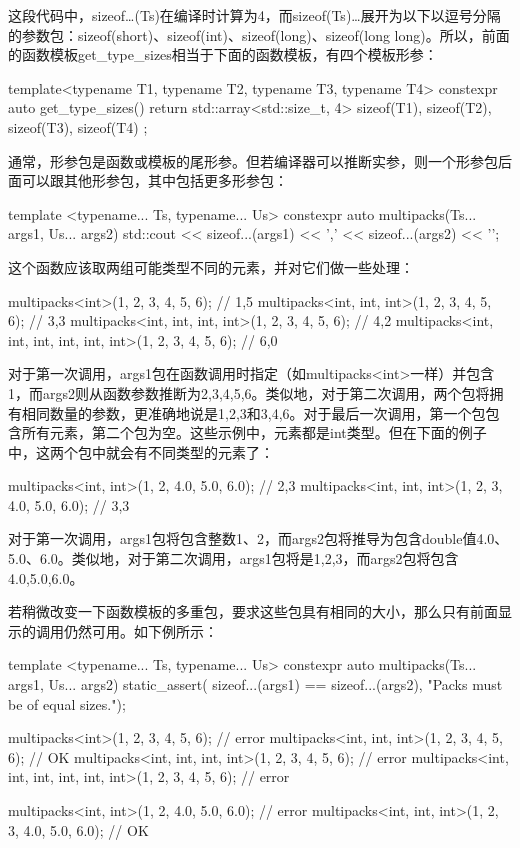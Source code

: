 这段代码中，sizeof…(Ts)在编译时计算为4，而sizeof(Ts)…展开为以下以逗号分隔的参数包：sizeof(short)、sizeof(int)、sizeof(long)、sizeof(long long)。所以，前面的函数模板get\_type\_sizes相当于下面的函数模板，有四个模板形参：

\begin{cpp}
template<typename T1, typename T2,
         typename T3, typename T4>
constexpr auto get_type_sizes()
{
	return std::array<std::size_t, 4> {
		sizeof(T1), sizeof(T2), sizeof(T3), sizeof(T4)
	};
}
\end{cpp}

通常，形参包是函数或模板的尾形参。但若编译器可以推断实参，则一个形参包后面可以跟其他形参包，其中包括更多形参包：

\begin{cpp}
template <typename... Ts, typename... Us>
constexpr auto multipacks(Ts... args1, Us... args2)
{
	std::cout << sizeof...(args1) << ','
	          << sizeof...(args2) << '\n';
}
\end{cpp}

这个函数应该取两组可能类型不同的元素，并对它们做一些处理：

\begin{cpp}
multipacks<int>(1, 2, 3, 4, 5, 6);
                // 1,5
multipacks<int, int, int>(1, 2, 3, 4, 5, 6);
                // 3,3
multipacks<int, int, int, int>(1, 2, 3, 4, 5, 6);
                // 4,2
multipacks<int, int, int, int, int, int>(1, 2, 3, 4, 5, 6);
                // 6,0
\end{cpp}

对于第一次调用，args1包在函数调用时指定（如multipacks<int>一样）并包含1，而args2则从函数参数推断为2,3,4,5,6。类似地，对于第二次调用，两个包将拥有相同数量的参数，更准确地说是1,2,3和3,4,6。对于最后一次调用，第一个包包含所有元素，第二个包为空。这些示例中，元素都是int类型。但在下面的例子中，这两个包中就会有不同类型的元素了：

\begin{cpp}
multipacks<int, int>(1, 2, 4.0, 5.0, 6.0); // 2,3
multipacks<int, int, int>(1, 2, 3, 4.0, 5.0, 6.0); // 3,3
\end{cpp}

对于第一次调用，args1包将包含整数1、2，而args2包将推导为包含double值4.0、5.0、6.0。类似地，对于第二次调用，args1包将是1,2,3，而args2包将包含4.0,5.0,6.0。

若稍微改变一下函数模板的多重包，要求这些包具有相同的大小，那么只有前面显示的调用仍然可用。如下例所示：

\begin{cpp}
template <typename... Ts, typename... Us>
constexpr auto multipacks(Ts... args1, Us... args2)
{
	static_assert(
	sizeof...(args1) == sizeof...(args2),
	"Packs must be of equal sizes.");
}

multipacks<int>(1, 2, 3, 4, 5, 6); // error
multipacks<int, int, int>(1, 2, 3, 4, 5, 6); // OK
multipacks<int, int, int, int>(1, 2, 3, 4, 5, 6); // error
multipacks<int, int, int, int, int, int>(1, 2, 3, 4, 5, 6); // error

multipacks<int, int>(1, 2, 4.0, 5.0, 6.0); // error
multipacks<int, int, int>(1, 2, 3, 4.0, 5.0, 6.0); // OK
\end{cpp}

